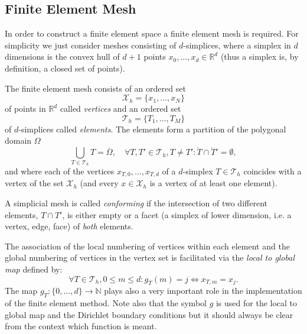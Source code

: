 \documentclass[a4paper,12pt]{article}
\begin{document}
\subsection{Finite Element Mesh}

In order to construct a finite element space a finite element mesh is required.
For simplicity we just consider meshes consisting of $d$-simplices, where a simplex
in $d$ dimensions is the convex hull of $d+1$ points $x_{0},\ldots,x_{d}\in\mathbb{R}^d$
(thus a simplex is, by definition, a closed set of points).

The finite element mesh consists of an ordered set
\begin{equation}
\mathcal{X}_h = \{x_1,\ldots,x_N\}
\end{equation}
of points in $\mathbb{R}^d$ called {\em vertices} and an ordered set 
\begin{equation}
\mathcal{T}_h = \{T_1, \ldots, T_M\}
\end{equation}
of $d$-simplices called {\em elements}.
The elements form a partition of the polygonal domain $\Omega$
\begin{equation}
\bigcup_{T\in \mathcal{T}_h} T = \overline{\Omega}, \quad 
\forall T, T' \in \mathcal{T}_h, T\neq T' : \mathring{T} \cap \mathring{T}' = \emptyset,
\end{equation}
and where each of the vertices $x_{T,0},\ldots,x_{T,d}$  of a $d$-simplex $T\in\mathcal{T}_h$
coincides with a vertex of the set $\mathcal{X}_h$ (and every $x\in\mathcal{X}_h$ is a vertex
of at least one element).

A simplicial mesh is called {\em conforming} if
the intersection of two different elements, $T\cap T'$, is either
empty or a facet (a simplex of lower dimension, i.e. a vertex, edge, face) of {\em both} elements.

The association of the local numbering of vertices within each element 
and the global numbering of vertices in the vertex set is facilitated
via the {\em local to global map} defined by:
\begin{equation}
\forall T\in\mathcal{T}_h, 0\leq m \leq d: g_T(m) = j \Leftrightarrow x_{T,m} = x_{j} .
\end{equation}
The map $g_T : \{0,\ldots,d\}\to\mathbb{N}$ 
plays also a very important role in the implementation of the finite element method.
Note also that the symbol $g$ is used for the local to global map and the Dirichlet
boundary conditions but it should always be clear from the context which function is meant.
\end{document}
